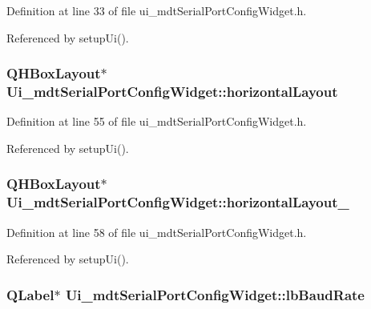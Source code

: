 Definition at line 33 of file ui\-\_\-mdt\-Serial\-Port\-Config\-Widget.\-h.



Referenced by setup\-Ui().

\hypertarget{class_ui__mdt_serial_port_config_widget_a6ae3bdc4ccb4e7fbca35fd8e4cd3196d}{
\subsubsection[{horizontal\-Layout}]{\setlength{\rightskip}{0pt plus 5cm}Q\-H\-Box\-Layout$\ast$ Ui\-\_\-mdt\-Serial\-Port\-Config\-Widget\-::horizontal\-Layout}}\label{class_ui__mdt_serial_port_config_widget_a6ae3bdc4ccb4e7fbca35fd8e4cd3196d}


Definition at line 55 of file ui\-\_\-mdt\-Serial\-Port\-Config\-Widget.\-h.



Referenced by setup\-Ui().

\hypertarget{class_ui__mdt_serial_port_config_widget_a0d3262484b2951a81e10046a2e03b274}{
\subsubsection[{horizontal\-Layout\-\_\-2}]{\setlength{\rightskip}{0pt plus 5cm}Q\-H\-Box\-Layout$\ast$ Ui\-\_\-mdt\-Serial\-Port\-Config\-Widget\-::horizontal\-Layout\-\_}}\label{class_ui__mdt_serial_port_config_widget_a0d3262484b2951a81e10046a2e03b274}


Definition at line 58 of file ui\-\_\-mdt\-Serial\-Port\-Config\-Widget.\-h.



Referenced by setup\-Ui().

\hypertarget{class_ui__mdt_serial_port_config_widget_a6df63f8e5c4434b54a34168da9be0845}{
\subsubsection[{lb\-Baud\-Rate}]{\setlength{\rightskip}{0pt plus 5cm}Q\-Label$\ast$ Ui\-\_\-mdt\-Serial\-Port\-Config\-Widget\-::lb\-Baud\-Rate}}\label{class_ui__mdt_serial_port_config_widget_a6df63f8e5c4434b54a34168da9be0845}



